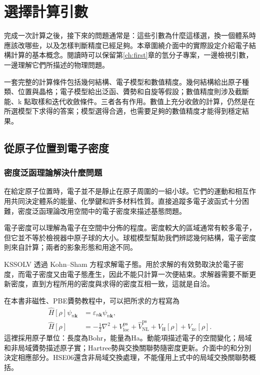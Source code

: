 \chapter{選擇計算引數}\label{ch:theory}

完成一次計算之後，接下來的問題通常是：這些引數為什麼這樣選，換一個體系時應該改哪些，以及怎樣判斷精度已經足夠。本章圍繞介面中的實際設定介紹電子結構計算的基本概念。閱讀時可以保留第\ref{ch:first}章的氫分子專案，一邊檢視引數，一邊理解它們所描述的物理問題。

一套完整的計算條件包括幾何結構、電子模型和數值精度。幾何結構給出原子種類、位置與晶格；電子模型給出泛函、贗勢和自旋等假設；數值精度則涉及截斷能、k 點取樣和迭代收斂條件。三者各有作用。數值上充分收斂的計算，仍然是在所選模型下求得的答案；模型選得合適，也需要足夠的數值精度才能得到穩定結果。

\section{從原子位置到電子密度}

\subsection{密度泛函理論解決什麼問題}

在給定原子位置時，電子並不是靜止在原子周圍的一組小球。它們的運動和相互作用共同決定體系的能量、化學鍵和許多材料性質。直接追蹤多電子波函式十分困難，密度泛函理論改用空間中的電子密度來描述基態問題。

電子密度可以理解為電子在空間中分佈的程度。密度較大的區域通常有較多電子，但它並不等於檢視器中原子球的大小。球棍模型幫助我們辨認幾何結構，電子密度則來自計算；兩者的影象形態和用途不同。

KSSOLV 透過 Kohn--Sham 方程求解電子態。用於求解的有效勢取決於電子密度，而電子密度又由電子態產生，因此不能只計算一次便結束。求解器需要不斷更新密度，直到方程所用的密度與求得的密度互相一致，這就是自洽。


在本書非磁性、PBE贗勢教程中，可以把所求的方程寫為
\begin{equation}
  \begin{aligned}
  \widehat H[\rho]\psi_{n\mathbf k}
    &=\varepsilon_{n\mathbf k}\psi_{n\mathbf k},\\
  \widehat H[\rho]&= -\frac12\nabla^2
  +V_{\mathrm{loc}}^{\mathrm{ps}}+\widehat V_{\mathrm{NL}}^{\mathrm{ps}}
  +V_{\mathrm H}[\rho]+V_{\mathrm{xc}}[\rho].
  \end{aligned}
  \label{eq:ks-operator}
\end{equation}
這裡採用原子單位：長度為Bohr，能量為Ha。動能項描述電子的空間變化；局域和非局域贗勢描述原子實；Hartree勢與交換關聯勢隨密度更新。介面中的和分別決定相應部分。HSE06還含非局域交換處理，不能僅用上式中的局域交換關聯勢概括。

